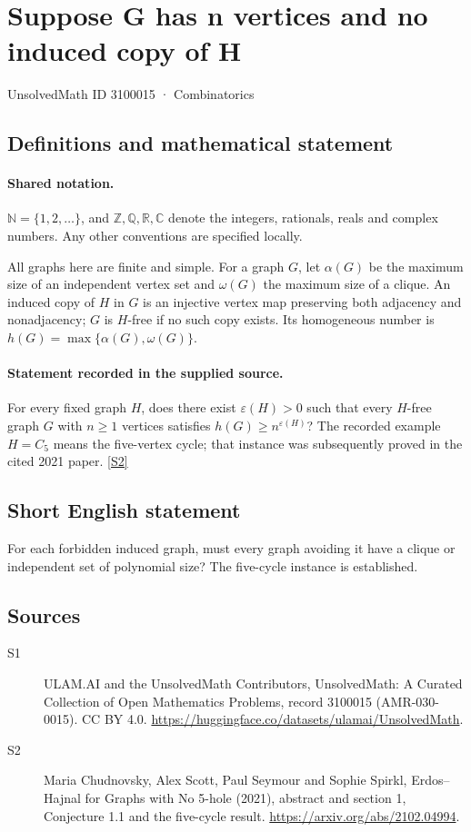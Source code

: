 \documentclass[11pt]{article}
\newcommand{\sref}[2]{\hyperlink{source:#1:#2}{[S#2]}}
\begin{document}
\setcounter{section}{3100014}
\section{Suppose G has n vertices and no induced copy of H}\label{3100015}
{\small\sffamily UnsolvedMath ID 3100015 · Combinatorics}
\subsection{Definitions and mathematical statement}

\paragraph{Shared notation.}$\mathbb N=\{1,2,\ldots\}$, and $\mathbb Z,\mathbb Q,\mathbb R,\mathbb C$ denote the integers, rationals, reals and complex numbers. Any other conventions are specified locally.


All graphs here are finite and simple. For a graph $G$, let $\alpha(G)$ be the maximum size of an independent vertex set and $\omega(G)$ the maximum size of a clique. An induced copy of $H$ in $G$ is an injective vertex map preserving both adjacency and nonadjacency; $G$ is $H$-free if no such copy exists. Its homogeneous number is $h(G)=\max\{\alpha(G),\omega(G)\}$.
\paragraph{Statement recorded in the supplied source.}
For every fixed graph $H$, does there exist $\varepsilon(H)>0$ such that every $H$-free graph $G$ with $n\geq1$ vertices satisfies $h(G)\geq n^{\varepsilon(H)}$? The recorded example $H=C_5$ means the five-vertex cycle; that instance was subsequently proved in the cited 2021 paper. \sref{3100015}{2}
\subsection{Short English statement}
For each forbidden induced graph, must every graph avoiding it have a clique or independent set of polynomial size? The five-cycle instance is established.
\subsection{Sources}
\begin{description}
\item[\hypertarget{source:3100015:1}{S1}] ULAM.AI and the UnsolvedMath Contributors, UnsolvedMath: A Curated Collection of Open Mathematics Problems, record 3100015 (AMR-030-0015). CC BY 4.0. \url{https://huggingface.co/datasets/ulamai/UnsolvedMath}.
\item[\hypertarget{source:3100015:2}{S2}] Maria Chudnovsky, Alex Scott, Paul Seymour and Sophie Spirkl, Erdos--Hajnal for Graphs with No 5-hole (2021), abstract and section 1, Conjecture 1.1 and the five-cycle result. \url{https://arxiv.org/abs/2102.04994}.
\end{description}
\label{end:3100015}
\end{document}
